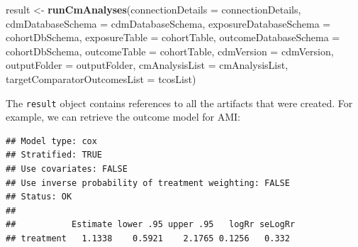 \documentclass[]{book}
\newenvironment{Shaded}{\begin{snugshade}}{\end{snugshade}}
\newcommand{\DataTypeTok}[1]{\textcolor[rgb]{0.13,0.29,0.53}{#1}}
\newcommand{\DecValTok}[1]{\textcolor[rgb]{0.00,0.00,0.81}{#1}}
\newcommand{\KeywordTok}[1]{\textcolor[rgb]{0.13,0.29,0.53}{\textbf{#1}}}
\newcommand{\NormalTok}[1]{#1}
\newcommand{\OperatorTok}[1]{\textcolor[rgb]{0.81,0.36,0.00}{\textbf{#1}}}
\newcommand{\StringTok}[1]{\textcolor[rgb]{0.31,0.60,0.02}{#1}}
\begin{document}
\begin{Shaded}
\begin{Highlighting}[]
\NormalTok{result <-}\StringTok{ }\KeywordTok{runCmAnalyses}\NormalTok{(}\DataTypeTok{connectionDetails =}\NormalTok{ connectionDetails,}
                        \DataTypeTok{cdmDatabaseSchema =}\NormalTok{ cdmDatabaseSchema,}
                        \DataTypeTok{exposureDatabaseSchema =}\NormalTok{ cohortDbSchema,}
                        \DataTypeTok{exposureTable =}\NormalTok{ cohortTable,}
                        \DataTypeTok{outcomeDatabaseSchema =}\NormalTok{ cohortDbSchema,}
                        \DataTypeTok{outcomeTable =}\NormalTok{ cohortTable,}
                        \DataTypeTok{cdmVersion =}\NormalTok{ cdmVersion,}
                        \DataTypeTok{outputFolder =}\NormalTok{ outputFolder,}
                        \DataTypeTok{cmAnalysisList =}\NormalTok{ cmAnalysisList,}
                        \DataTypeTok{targetComparatorOutcomesList =}\NormalTok{ tcosList)}
\end{Highlighting}
\end{Shaded}

The \texttt{result} object contains references to all the artifacts that were created. For example, we can retrieve the outcome model for AMI:

\begin{Shaded}
\end{Shaded}

\begin{verbatim}
## Model type: cox
## Stratified: TRUE
## Use covariates: FALSE
## Use inverse probability of treatment weighting: FALSE
## Status: OK
## 
##           Estimate lower .95 upper .95   logRr seLogRr
## treatment   1.1338    0.5921    2.1765 0.1256   0.332
\end{verbatim}
\end{document}
